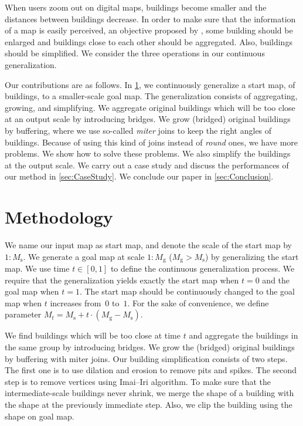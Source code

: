 When users zoom out on digital maps, 
buildings become smaller and the distances between buildings decrease. 
In order to make sure that the information of a map is easily perceived, 
an objective proposed by \citet{Weibel1997}, 
some building should be enlarged
and buildings close to each other should be aggregated.
Also, buildings should be simplified.
We consider the three operations in our continuous generalization.


Our contributions are as follows.
In \sect\ref{sec:Methodology},
we continuously generalize a start map, of buildings, 
to a smaller-scale goal map.
The generalization consists of aggregating, growing, and simplifying.
We aggregate original buildings which will be too close at an output scale 
by introducing bridges.
We grow (bridged) original buildings by buffering,
where we use so-called \emph{miter} joins to keep the right angles of buildings.
Because of using this kind of joins instead of \emph{round} ones,
we have more problems.
We show how to solve these problems.
We also simplify the buildings at the output scale.
We carry out a case study 
and discuss the performances of our method in \sect\ref{sec:CaseStudy}.
We conclude our paper in \sect\ref{sec:Conclusion}.



\section{Methodology}
\label{sec:Methodology}
We name our input map as start map,
and denote the scale of the start map by $1:M_\mathrm{s}$.
We generate a goal map at scale $1:M_\mathrm{g}$ 
($M_\mathrm{g} > M_\mathrm{s}$) by generalizing the start map. 
We use time $t\in[0,1]$ to define the continuous generalization
process. 
We require that the generalization yields exactly the start map when $t=0$ 
and the goal map when $t=1$.
The start map should be continuously changed to the goal map 
when $t$ increases from~$0$ to~$1$.
For the sake of convenience, we define parameter
$M_t= M_\mathrm{s} + t \cdot (M_\mathrm{g}-M_\mathrm{s})$.

We find buildings which will be too close at time $t$
and aggregate the buildings in the same group by introducing bridges.
We grow the (bridged) original buildings by buffering with miter joins.
Our building simplification consists of two steps.
The first one is to use dilation and erosion to remove pits and spikes.
The second step is to remove vertices using Imai--Iri algorithm.
To make sure that the intermediate-scale buildings never shrink,
we merge the shape of a building 
with the shape at the previously immediate step. 
Also, we clip the building using the shape on goal map.

